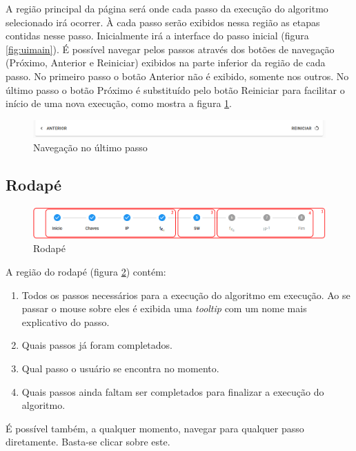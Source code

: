 A região principal da página será onde cada passo da execução do algoritmo selecionado irá ocorrer. À cada passo serão exibidos nessa região as etapas contidas nesse passo. Inicialmente irá a interface do passo inicial (figura \ref{fig:uimain}). É possível navegar pelos passos através dos botões de navegação (Próximo, Anterior e Reiniciar) exibidos na parte inferior da região de cada passo. No primeiro passo o botão Anterior não é exibido, somente nos outros. No último passo o botão Próximo é substituído pelo botão Reiniciar para facilitar o início de uma nova execução, como mostra a figura \ref{fig:uilastnav}.

\begin{figure}[H]
    \centering
    \caption{Navegação no último passo}
    \label{fig:uilastnav}
    \includegraphics[width=1\linewidth]{UI/UILastNavigation.png}
\end{figure}

\subsection{Rodapé}

\begin{figure}[H]
    \centering
    \caption{Rodapé}
    \label{fig:uifooter}
    \includegraphics[width=1\linewidth]{UI/UIFooter.png}
\end{figure}

A região do rodapé (figura \ref{fig:uifooter}) contém:
\begin{enumerate}
    \item Todos os passos necessários para a execução do algoritmo em execução. Ao se passar o mouse sobre eles é exibida uma \textit{tooltip} com um nome mais explicativo do passo.
    \item Quais passos já foram completados.
    \item Qual passo o usuário se encontra no momento.
    \item Quais passos ainda faltam ser completados para finalizar a execução do algoritmo.
\end{enumerate}
É possível também, a qualquer momento, navegar para qualquer passo diretamente. Basta-se clicar sobre este.


